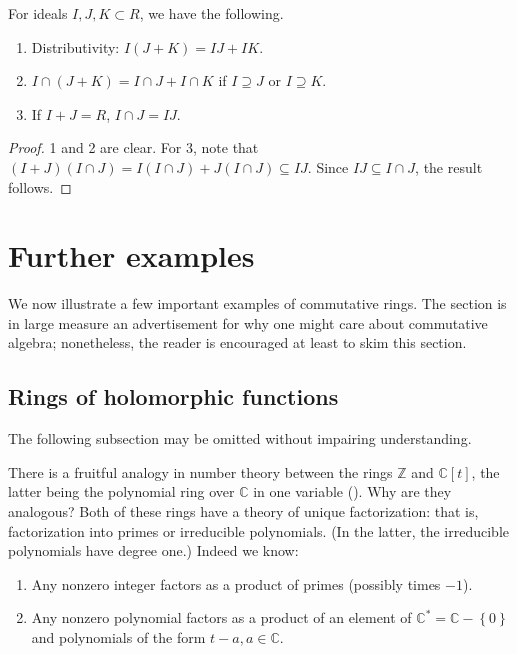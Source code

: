 \begin{proposition}
For ideals $I, J, K \subset R$, we have the following.

\begin{enumerate}
  \item Distributivity: $I(J + K) = IJ + IK$.
  \item $I \cap (J + K) = I \cap J + I \cap K$ if $I \supseteq J$ or $I \supseteq K$.
  \item If $I + J = R$, $I \cap J = IJ$.
\end{enumerate}

\begin{proof}
1 and 2 are clear.  For 3, note that $(I + J)(I \cap J) = I(I \cap J)
+ J(I \cap J) \subseteq IJ$.  Since $IJ \subseteq I \cap J$, the result
follows.
\end{proof}
\end{proposition}

\section{Further examples}

We now illustrate a few important examples of 
commutative rings. The section is in large measure an advertisement for why
one might care about commutative algebra; nonetheless, the reader is
encouraged at least to skim this section.

\subsection{Rings of holomorphic functions}

The following subsection may be omitted without impairing understanding.

There is a fruitful analogy in number theory between the rings $\mathbb{Z}$ and
$\mathbb{C}[t]$, the latter being the polynomial ring over $\mathbb{C}$ in one
variable ().  Why are they analogous? Both of these rings have a theory of unique
factorization:  that is, factorization into primes or irreducible polynomials. (In the
latter, the irreducible polynomials have degree one.)
Indeed we know:
\begin{enumerate}
\item Any nonzero integer factors as a product of primes (possibly times $-1$). 
\item Any  nonzero polynomial factors as a product of an element of
$\mathbb{C}^* =\mathbb{C} - \left\{0\right\}$ and polynomials of the form $t -
a, a \in \mathbb{C}$.
\end{enumerate}


